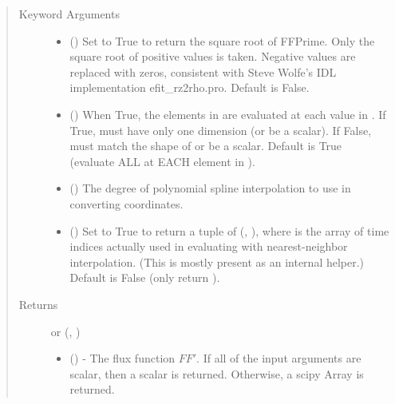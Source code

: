 \documentclass[letterpaper,10pt,english]{sphinxmanual}
\begin{document}
\begin{fulllineitems}
\begin{fulllineitems}
\begin{quote}
\begin{description}
\begin{itemize}
\end{itemize}

\item[{Keyword Arguments}] \leavevmode\begin{itemize}
\item {} 
 () \textendash{} Set to True to return the square root of FFPrime.
Only the square root of positive values is taken. Negative
values are replaced with zeros, consistent with Steve Wolfe’s
IDL implementation efit\_rz2rho.pro. Default is False.

\item {} 
 () \textendash{} When True, the elements in  are evaluated
at each value in . If True,  must have only one dimension
(or be a scalar). If False,  must match the shape of 
or be a scalar. Default is True (evaluate ALL  at EACH
element in ).

\item {} 
 () \textendash{} The degree of polynomial spline interpolation to
use in converting coordinates.

\item {} 
 () \textendash{} Set to True to return a tuple of (,
), where  is the array of time indices
actually used in evaluating  with nearest-neighbor
interpolation. (This is mostly present as an internal helper.)
Default is False (only return ).

\end{itemize}

\item[{Returns}] \leavevmode

 or (, )
\begin{itemize}
\item {} 
 () - The flux function \(FF'\).
If all of the input arguments are scalar, then a scalar is returned.
Otherwise, a scipy Array is returned.


\end{itemize}
\end{description}
\end{quote}
\end{fulllineitems}
\end{fulllineitems}
\end{document}

